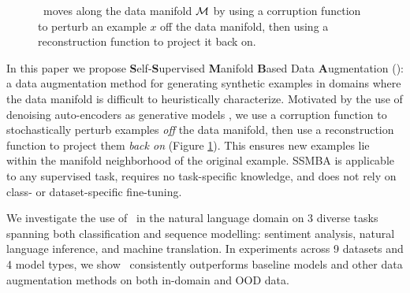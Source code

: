\begin{figure}[t!]
\centering
{}
\caption{\ssmba\ moves along the data manifold $\mathcal{M}$ by using a corruption function to perturb an example $x$ off the data manifold, then using 
a reconstruction function to project it back on.}
\label{fig:ssmba_process}
\end{figure}


In this paper we propose \textbf{S}elf-\textbf{S}upervised \textbf{M}anifold \textbf{B}ased Data \textbf{A}ugmentation (\textbf{\ssmba}): a data augmentation method for generating synthetic examples in domains where the data manifold is difficult to heuristically characterize.
Motivated by the use of denoising auto-encoders as generative models \citep{bengio2013generalized}, we use a corruption function to stochastically perturb examples \textit{off} the data manifold, then use a reconstruction function to project them \textit{back on} (Figure \ref{fig:ssmba_process}).
This ensures new examples lie within the manifold neighborhood of the original example.
SSMBA is applicable to any supervised task, requires no task-specific knowledge, and does not rely on class- or dataset-specific fine-tuning.

We investigate the use of \ssmba\ in the natural language domain on 3 diverse tasks spanning both classification and sequence modelling: sentiment analysis, natural language inference, and machine translation.
In experiments across 9 datasets and 4 model types, we show \ssmba\ consistently outperforms baseline models and other data augmentation methods on both in-domain and OOD data. %
